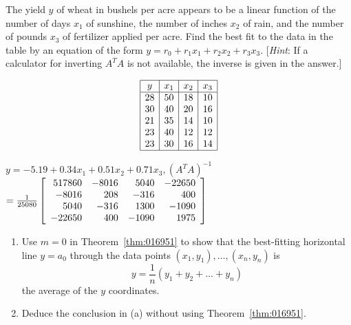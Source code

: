 \begin{multicols}{2}
\begin{ex}
The yield $y$ of wheat in bushels per acre appears to be a linear function of the number of days $x_{1}$ of sunshine, the number of inches $x_{2}$ of rain, and the number of pounds $x_{3}$ of fertilizer applied per acre. Find the best fit to the data in the table by an equation of the form $y = r_{0} + r_{1}x_{1} + r_{2}x_{2} + r_{3}x_{3}$. [\textit{Hint}: If a calculator for inverting $A^{T}A$ is not available, the inverse is given in the answer.]

\begin{equation*}
\begin{array}{|c|c|c|c|}
\hline
 y & x_1 & x_2 & x_3 \\ \hline
28 & 50  & 18  & 10 \\ 
30 & 40  & 20  & 16 \\ 
21 & 35  & 14  & 10 \\ 
23 & 40  & 12  & 12 \\ 
23 & 30  & 16  & 14 \\ \hline
\end{array}
\end{equation*}

\begin{sol}
$y = -5.19 + 0.34x_{1} + 0.51x_{2} + 0.71x_{3}, (A^TA)^{-1}$ \\
$ = \tfrac{1}{25080}
\left[ \begin{array}{rrrr}
517860 & -8016 &  5040 & -22650 \\
 -8016 &   208 &  -316 &    400 \\
  5040 &  -316 &  1300 &  -1090 \\
-22650 &   400 & -1090 &   1975
\end{array} \right]$
\end{sol}
\end{ex}

\begin{ex}
\begin{enumerate}[label={\alph*.}]
\item Use $m = 0$ in Theorem~\ref{thm:016951} to show that the best-fitting horizontal line $y = a_{0}$ through the data points $(x_{1}, y_{1}), \dots, (x_{n}, y_{n})$ is 
\begin{equation*}
y = \frac{1}{n}(y_1 + y_2 + \dots + y_n)
\end{equation*}
the average of the $y$ coordinates.

\item Deduce the conclusion in (a) without using Theorem~\ref{thm:016951}.


\end{enumerate}
\end{ex}
\end{multicols}
